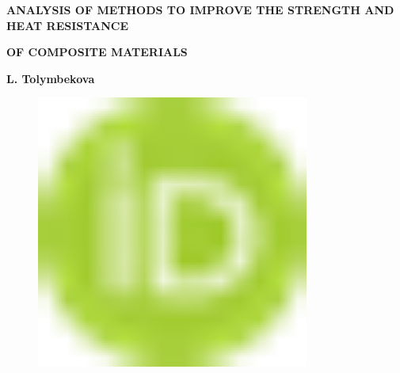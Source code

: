 
{\bfseries ANALYSIS OF METHODS TO IMPROVE THE STRENGTH AND HEAT RESISTANCE}

{\bfseries OF COMPOSITE MATERIALS}

{\bfseries L.
Tolymbekova}
\begin{figure}[H]
	\centering
	\includegraphics[width=0.8\textwidth]{media/chem/image1}
	\caption*{}
\end{figure}

